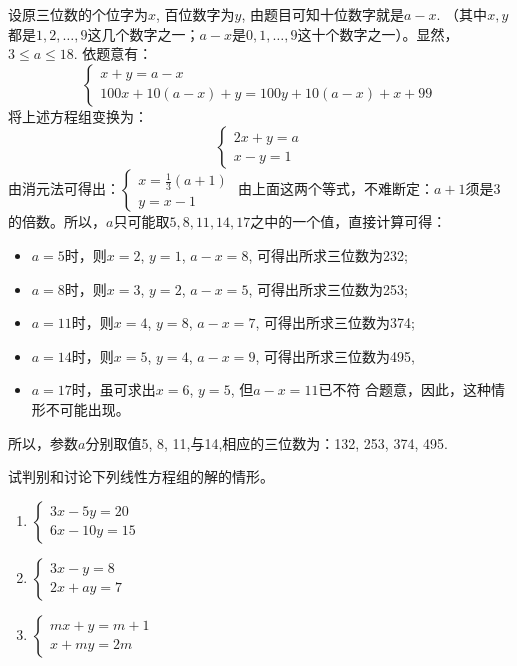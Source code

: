 \begin{solution}
设原三位数的个位字为$x$, 百位数字为$y$, 由题目可知十位数字就是$a-x$. （其中$x,y$都是$1, 2,\ldots,9$这几个数字之一；$a-x$是$0, 1,\ldots,9$这十个数字之一）。显然，$3\le a\le 18$. 依题意有：
\[\begin{cases}
    x+y=a-x\\
    100x+10(a-x)+y=100y+10(a-x)+x+99
\end{cases}\]
将上述方程组变换为：
\[\begin{cases}
    2x+y=a\\x-y=1
\end{cases}\]
由消元法可得出：$\begin{cases}
    x=\frac{1}{3}(a+1)\\ y=x-1
\end{cases}$
由上面这两个等式，不难断定：$a+1$须是3的倍数。所以，$a$只可能取$5, 8, 11, 14, 17$之中的一个值，直接计算可得：
\begin{itemize}
    \item $a=5$时，则$x=2$, $y=1$, $a-x=8$,
    可得出所求三位数为232;
\item $a=8$时，则$x=3$, $y=2$, $a-x=5$,
可得出所求三位数为253;
\item $a=11$时，则$x=4$, $y=8$, $a-x=7$,
可得出所求三位数为374;
\item $a=14$时，则$x=5$, $y=4$, $a-x=9$,
可得出所求三位数为495,
\item $a=17$时，虽可求出$x=6$, $y=5$, 但$a-x=11$已不符
合题意，因此，这种情形不可能出现。
 \end{itemize}   

所以，参数$a$分别取值5, 8, 11,与14,相应的三位数为：132, 253, 374, 495.
\end{solution}    

\begin{ex}
    试判别和讨论下列线性方程组的解的情形。
    \begin{multicols}{2}
\begin{enumerate}
    \item $\begin{cases}
        3x-5y=20\\6x-10y=15
    \end{cases}$
    \item $\begin{cases}
        3x-y=8\\2x+ay=7
    \end{cases}$
    \item $\begin{cases}
mx+y=m+1\\x+my=2m        
    \end{cases}$
\end{enumerate}        
    \end{multicols}
\end{ex}

